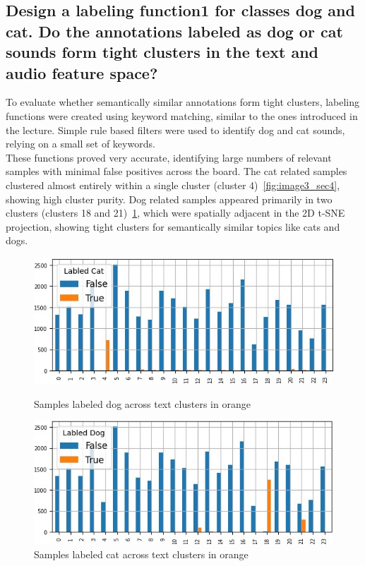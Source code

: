 \subsection{Design a labeling function1 for classes dog and cat. Do the annotations labeled as dog or cat sounds
form tight clusters in the text and audio feature space?}
\label{sec:Text Features:b}

To evaluate whether semantically similar annotations form tight clusters, labeling functions were created using keyword matching, similar to the ones introduced in the lecture. Simple rule based filters were used to identify dog and cat sounds, relying on a small set of keywords.\\
These functions proved very accurate, identifying large numbers of relevant samples with minimal false positives across the board. The cat related samples clustered almost entirely within a single cluster (cluster 4)~\ref{fig:image3_sec4}, showing high cluster purity. Dog related samples appeared primarily in two clusters (clusters 18 and 21)~\ref{fig:image4_sec4}, which were spatially adjacent in the 2D t-SNE projection, showing tight clusters for semantically similar topics like cats and dogs.
\begin{figure}[h]
  \centering
  \begin{minipage}[b]{0.49\textwidth}
    \centering
    \includegraphics[width=\textwidth]{figs/cat_text_cluster.jpg}
    \caption{Samples labeled dog across text clusters in orange}
    \label{fig:image3_sec4}
  \end{minipage}
  \hfill
  \begin{minipage}[b]{0.49\textwidth}
    \centering
    \includegraphics[width=\textwidth]{figs/dog_text_cluster.jpg}
    \caption{Samples labeled cat across text clusters in orange}
    \label{fig:image4_sec4}
  \end{minipage}
\end{figure}


